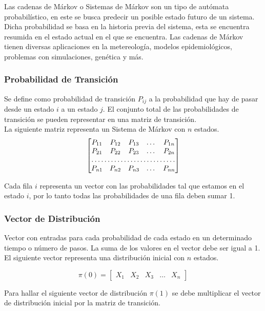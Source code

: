 \documentclass{article}
\begin{document}
Las cadenas de Márkov o Sistemas de Márkov son un tipo de autómata probabilístico, en este se busca predecir un posible estado futuro de un sistema. Dicha probabilidad se basa en la historia previa del sistema, esta se encuentra resumida en el estado actual en el que se encuentra. Las cadenas de Márkov tienen diversas aplicaciones en la metereología, modelos epidemiológicos, problemas con simulaciones, genética y más. 

\subsubsection{Probabilidad de Transición}

Se define como probabilidad de transición $P_{ij}$ a la probabilidad que hay de pasar desde un estado $i$ a un estado $j$. El conjunto total de las probabilidades de transición se pueden representar en una matriz de transición.\\
La siguiente matriz representa un Sistema de Márkov con $n$ estados. \\
$$
\begin{bmatrix}
    P_{11}       & P_{12} & P_{13} & \dots & P_{1n} \\
    P_{21}       & P_{22} & P_{23} & \dots & P_{2n} \\
    \hdotsfor{5} \\
    P_{n1}       & P_{n2} & P_{n3} & \dots & P_{nn}
\end{bmatrix}
$$

Cada fila $i$ representa un vector con las probabilidades tal que estamos en el estado $i$, por lo tanto todas las probabilidades de una fila deben sumar 1.

\subsubsection{Vector de Distribución}

Vector con entradas para cada probabilidad de cada estado en un determinado tiempo o número de pasos. La suma de los valores en el vector debe ser igual a 1.\\
El siguiente vector representa una distribución inicial con $n$ estados.

$$
\pi(0) = 
\begin{bmatrix}
    X_{1} & X_{2} & X_{3} & \dots & X_{n}
\end{bmatrix}
$$

Para hallar el siguiente vector de distribución $\pi(1)$ se debe multiplicar el vector de distribución inicial por la matriz de transición.
\end{document}
